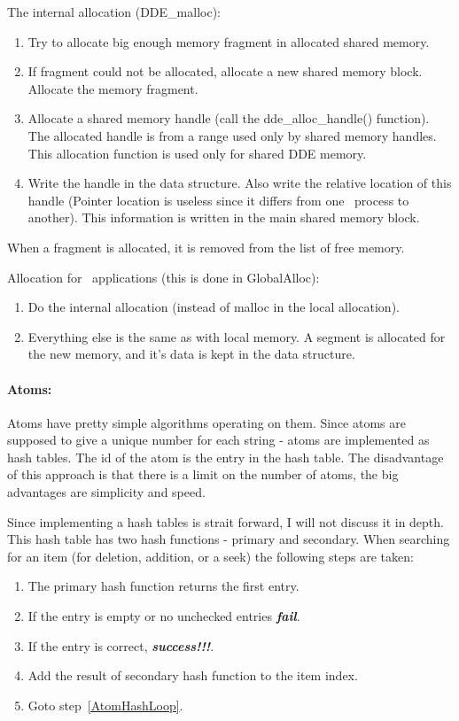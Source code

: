 The internal allocation (DDE\_malloc):
\begin{enumerate}
  \item Try to allocate big enough memory fragment in allocated shared
    memory. 
  \item If fragment could not be allocated, allocate a new shared
    memory block. Allocate the memory fragment.
  \item Allocate a shared memory handle (call the dde\_alloc\_handle() 
    function). The allocated handle is from a range used only by
    shared memory handles. This allocation function is used only for
    shared DDE memory.
  \item Write the handle in the data structure. Also write the
    relative location of this handle (Pointer location is useless since
    it differs from one \Wine\ process to another).
    This information is written in the main shared memory block.    
\end{enumerate}
When a fragment is allocated, it is removed from the list of free
memory.

Allocation for \windoz\ applications (this is done in GlobalAlloc):
\begin{enumerate}
  \item Do the internal allocation (instead of malloc in the local
    allocation). 
  \item Everything else is the same as with local memory. A segment is
    allocated for the new memory, and it's data is kept in the data
    structure. 
\end{enumerate}


\paragraph{Atoms:}
Atoms have pretty simple algorithms operating on them. Since atoms are
supposed to give a unique number for each string - atoms are
implemented as hash tables. The id of the atom is the entry in the
hash table. The disadvantage of this approach is that there is a limit
on the number of atoms, the big advantages are simplicity and
speed.

Since implementing a hash tables is strait forward, I will not
discuss it in depth. This hash table has two hash functions - primary
and secondary. When searching for an item (for deletion, addition, or
a seek) the following steps are taken:
\begin{enumerate}
  \item The primary hash function returns the first entry.
  \item \label{AtomHashLoop}
    If the entry is empty or no unchecked entries {\bf \em fail}.
  \item If the entry is correct, {\bf \em success!!!}.
  \item Add the result of secondary hash function to the item index.
  \item Goto step~\ref{AtomHashLoop}.
\end{enumerate}


